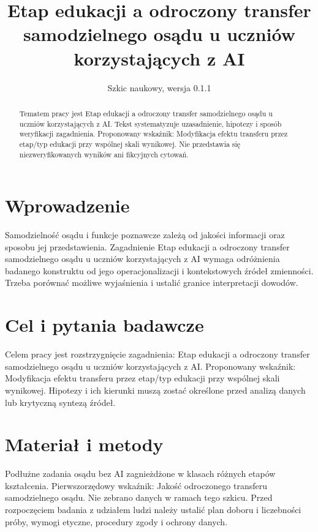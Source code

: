 \documentclass[11pt,a4paper]{article}
\title{Etap edukacji a odroczony transfer samodzielnego osądu u uczniów korzystających z AI}
\author{}
\date{Szkic naukowy, wersja 0.1.1}
\begin{document}
\maketitle

\begin{abstract}

Tematem pracy jest Etap edukacji a odroczony transfer samodzielnego osądu u uczniów korzystających z AI. Tekst systematyzuje uzasadnienie, hipotezy i sposób weryfikacji zagadnienia. Proponowany wskaźnik: Modyfikacja efektu transferu przez etap/typ edukacji przy wspólnej skali wynikowej. Nie przedstawia się niezweryfikowanych wyników ani fikcyjnych cytowań.

\end{abstract}

\section{Wprowadzenie}

Samodzielność osądu i funkcje poznawcze zależą od jakości informacji oraz sposobu jej przedstawienia. Zagadnienie Etap edukacji a odroczony transfer samodzielnego osądu u uczniów korzystających z AI wymaga odróżnienia badanego konstruktu od jego operacjonalizacji i kontekstowych źródeł zmienności. Trzeba porównać możliwe wyjaśnienia i ustalić granice interpretacji dowodów.

\section{Cel i pytania badawcze}

Celem pracy jest rozstrzygnięcie zagadnienia: Etap edukacji a odroczony transfer samodzielnego osądu u uczniów korzystających z AI. Proponowany wskaźnik: Modyfikacja efektu transferu przez etap/typ edukacji przy wspólnej skali wynikowej. Hipotezy i ich kierunki muszą zostać określone przed analizą danych lub krytyczną syntezą źródeł.

\section{Materiał i metody}

Podłużne zadania osądu bez AI zagnieżdżone w klasach różnych etapów kształcenia. Pierwszorzędowy wskaźnik: Jakość odroczonego transferu samodzielnego osądu. Nie zebrano danych w ramach tego szkicu. Przed rozpoczęciem badania z udziałem ludzi należy ustalić plan doboru i liczebności próby, wymogi etyczne, procedury zgody i ochrony danych.
\end{document}
